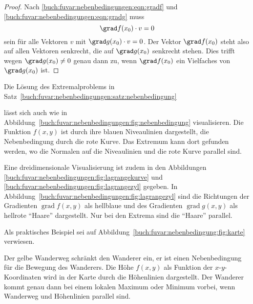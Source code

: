 \begin{proof}
Nach
\eqref{buch:fuvar:nebenbedingungen:eqn:gradf}
und
\eqref{buch:fuvar:nebenbedingungen:eqn:gradg}
muss 
\[
\grad f(x_0)\cdot v = 0
\]
sein für alle Vektoren $v$ mit $\grad g(x_0)\cdot v= 0$.
Der Vektor $\grad f(x_0)$ steht also auf allen Vektoren senkrecht, die
auf $\grad g(x_0)$ senkrecht stehen.
Dies trifft wegen $\grad g(x_0)\ne 0$ genau dann zu, wenn $\grad f(x_0)$
ein Vielfaches von $\grad g(x_0)$ ist.
\end{proof}

Die Lösung des Extremalproblems in
Satz~\ref{buch:fuvar:nebenbedingungen:satz:nebenbedingung}

lässt sich auch wie in
Abbildung~\ref{buch:fuvar:nebenbedingungen:fig:nebenbedingung}
visualisieren.
Die Funktion $f(x,y)$ ist durch ihre blauen Niveaulinien 
dargestellt, die Nebenbedingung durch die rote Kurve.
Das Extremum kann dort gefunden werden, wo die Normalen auf die
Niveaulinien und die rote Kurve parallel sind.


Eine dreidimensionale Visualisierung ist zudem in den 
Abbildungen
\ref{buch:fuvar:nebenbedingungen:fig:lagrangekurve}
und
\ref{buch:fuvar:nebenbedingungen:fig:lagrangezyl}
gegeben.
In
Abbildung~\ref{buch:fuvar:nebenbedingungen:fig:lagrangezyl}
sind die Richtungen der Gradienten $\operatorname{grad} f(x,y)$ als
hellblaue und des Gradienten $\operatorname{grad}g(x,y)$ als hellrote
``Haare'' dargestellt.
Nur bei den Extrema sind die ``Haare'' parallel.

Als praktisches Beispiel sei auf
Abbildung~\ref{buch:fuvar:nebenbedingung:fig:karte}
verwiesen.

Der {\color{gelb}gelbe} Wanderweg schränkt den Wanderer ein,
er ist einen Nebenbedingung für die Bewegung des Wanderers.
Die Höhe $f(x,y)$ als Funktion der $x$-$y$-Koordinaten wird in
der Karte durch die Höhenlinien dargestellt.
Der Wanderer kommt genau dann bei einem lokalen Maximum oder
Minimum vorbei, wenn Wanderweg und Höhenlinien parallel sind.


